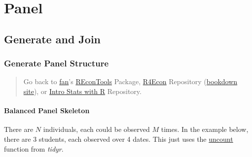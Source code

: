 \documentclass[
]{book}
\begin{document}
\hypertarget{panel}{%
\chapter{Panel}\label{panel}}

\hypertarget{generate-and-join}{%
\section{Generate and Join}\label{generate-and-join}}

\hypertarget{generate-panel-structure}{%
\subsection{Generate Panel Structure}\label{generate-panel-structure}}

\begin{quote}
Go back to \href{http://fanwangecon.github.io/CodeDynaAsset/}{fan}'s \href{https://fanwangecon.github.io/REconTools/}{REconTools} Package, \href{https://fanwangecon.github.io/R4Econ/}{R4Econ} Repository (\href{https://fanwangecon.github.io/R4Econ/bookdown}{bookdown site}), or \href{https://fanwangecon.github.io/Stat4Econ/}{Intro Stats with R} Repository.
\end{quote}

\hypertarget{balanced-panel-skeleton}{%
\subsubsection{Balanced Panel Skeleton}\label{balanced-panel-skeleton}}

There are \(N\) individuals, each could be observed \(M\) times. In the example below, there are 3 students, each observed over 4 dates. This just uses the \href{https://tidyr.tidyverse.org/reference/uncount.html}{uncount} function from \emph{tidyr}.
\end{document}
